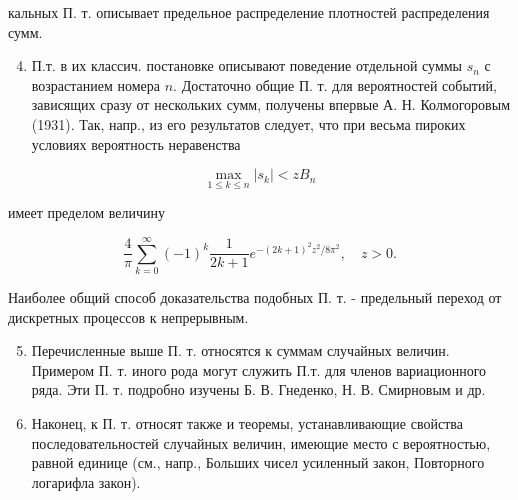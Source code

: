 \documentclass[10pt]{article}
\begin{document}
кальных П. т. описывает предельное распределение плотностей распределения сумм.



\begin{enumerate}

  \setcounter{enumi}{3}

  \item П.т. в их классич. постановке описывают поведение отдельной суммы $s_{n}$ с возрастанием номера $n$. Достаточно общие П. т. для вероятностей событий, зависящих сразу от нескольких сумм, получены впервые А. Н. Колмогоровым (1931). Так, напр., из его результатов следует, что при весьма пироких условиях вероятность неравенства

\end{enumerate}



\[

\max _{1 \leqslant k \leqslant n}\left|s_{k}\right|<z B_{n}

\]



имеет пределом величину



\[

\frac{4}{\pi} \sum_{k=0}^{\infty}(-1)^{k} \frac{1}{2 k+1} e^{-(2 k+1)^{2} z^{2} / 8 \pi^{2}}, \quad z>0 .

\]



Наиболее общий способ доказательства подобных П. т. - предельный переход от дискретных процессов к непрерывным.



\begin{enumerate}

  \setcounter{enumi}{4}

  \item Перечисленные выше П. т. относятся к суммам случайных величин. Примером П. т. иного рода могут служить П.т. для членов вариационного ряда. Эти П. т. подробно изучены Б. В. Гнеденко, Н. В. Смирновым и др.



  \item Наконец, к П. т. относят также и теоремы, устанавливающие свойства последовательностей случайных величин, имеющие место с вероятностью, равной единице (см., напр., Больших чисел усиленный закон, Повторного логарифла закон).



\end{enumerate}
\end{document}
